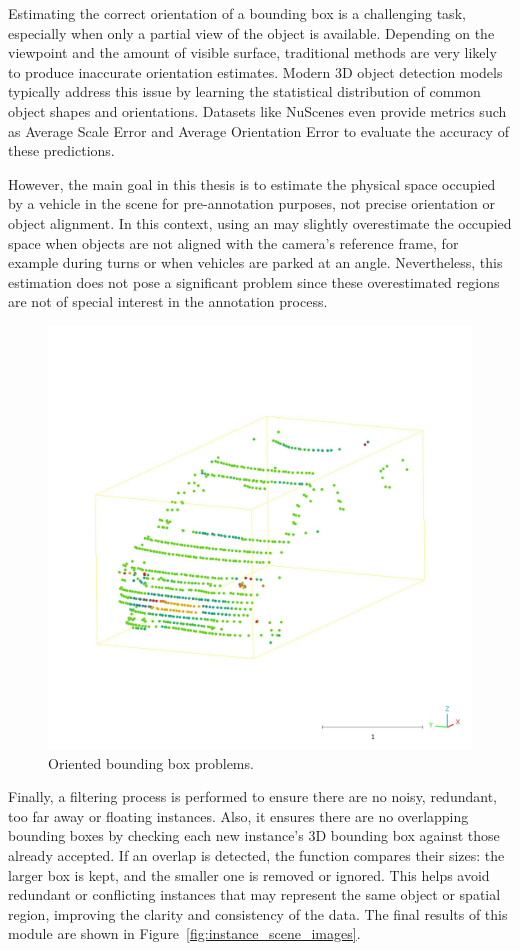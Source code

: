 Estimating the correct orientation of a bounding box is a challenging task, especially when only a partial view of the object is available. Depending on the viewpoint and the amount of visible surface, traditional methods are very likely to produce inaccurate orientation estimates. Modern 3D object detection models typically address this issue by learning the statistical distribution of common object shapes and orientations. Datasets like NuScenes even provide metrics such as Average Scale Error and Average Orientation Error to evaluate the accuracy of these predictions.

However, the main goal in this thesis is to estimate the physical space occupied by a vehicle in the scene for pre-annotation purposes, not precise orientation or object alignment. In this context, using an  may slightly overestimate the occupied space when objects are not aligned with the camera's reference frame, for example during turns or when vehicles are parked at an angle. Nevertheless, this estimation does not pose a significant problem since these overestimated regions are not of special interest in the annotation process.

\begin{figure}[!ht]
    \centering
    \includegraphics[width=0.5\linewidth]{images/methodology/oriendet_bbox_problem_aux.jpeg}
    \caption{Oriented bounding box problems.}
    \label{fig:oriented_bounding_box_problems}
\end{figure}

Finally, a filtering process is performed to ensure there are no noisy, redundant, too far away or floating instances. Also, it ensures there are no overlapping bounding boxes by checking each new instance's 3D bounding box against those already accepted. If an overlap is detected, the function compares their sizes: the larger box is kept, and the smaller one is removed or ignored. This helps avoid redundant or conflicting instances that may represent the same object or spatial region, improving the clarity and consistency of the data. The final results of this module are shown in Figure~\ref{fig:instance_scene_images}.

